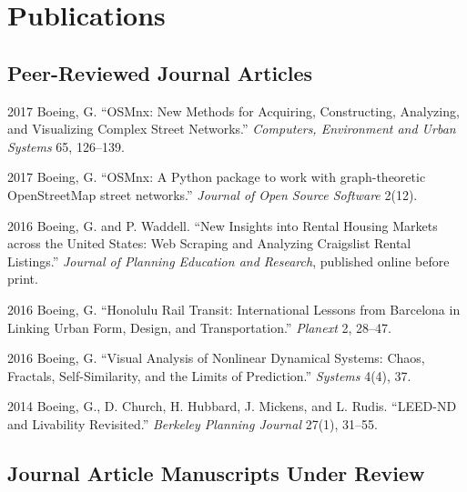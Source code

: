 \documentclass{academiccv}
\begin{document}
\section*{Publications}

\subsection*{Peer-Reviewed Journal Articles}

\begin{tablist}

\item[2017] \tab Boeing, G. \enquote{OSMnx: New Methods for Acquiring, Constructing, Analyzing, and Visualizing Complex Street Networks.} \emph{Computers, Environment and Urban Systems} 65, 126--139.

\item[2017] \tab Boeing, G. \enquote{OSMnx: A Python package to work with graph-theoretic OpenStreetMap street networks.} \emph{Journal of Open Source Software} 2(12).

\item[2016] \tab Boeing, G. and P. Waddell. \enquote{New Insights into Rental Housing Markets across the United States: Web Scraping and Analyzing Craigslist Rental Listings.} \emph{Journal of Planning Education and Research}, published online before print.

\item[2016] \tab Boeing, G. \enquote{Honolulu Rail Transit: International Lessons from Barcelona in Linking Urban Form, Design, and Transportation.} \emph{Planext} 2, 28--47.

\item[2016] \tab Boeing, G. \enquote{Visual Analysis of Nonlinear Dynamical Systems: Chaos, Fractals, Self-Similarity, and the Limits of Prediction.} \emph{Systems} 4(4), 37.

\item[2014] \tab Boeing, G., D. Church, H. Hubbard, J. Mickens, and L. Rudis. \enquote{LEED-ND and Livability Revisited.} \emph{Berkeley Planning Journal} 27(1), 31--55.

\end{tablist}



\subsection*{Journal Article Manuscripts Under Review}
\end{document}
